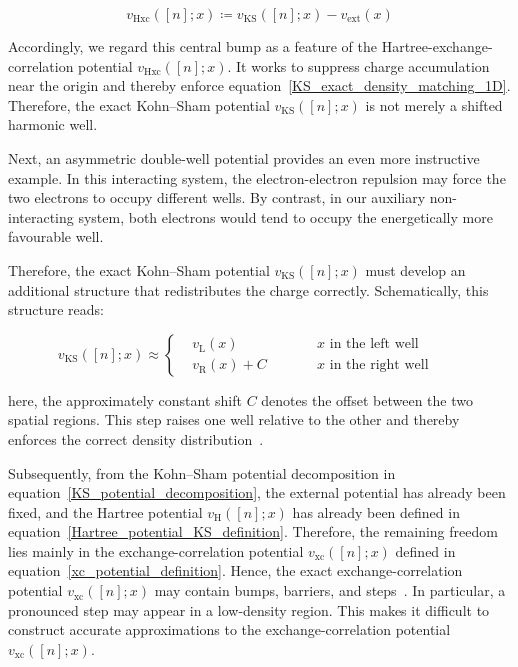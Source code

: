 \begin{equation}
    v_\mathrm{Hxc}([n];x)\coloneqq
    v_\mathrm{KS}([n];x)-v_\mathrm{ext}(x)
\label{Hxc_potential_definition_1D}
\end{equation}

Accordingly, we regard this central bump as a feature of the Hartree-exchange-correlation potential $v_\mathrm{Hxc}([n];x)$.
It works to suppress charge accumulation near the origin and thereby enforce equation~\eqref{KS_exact_density_matching_1D}.
Therefore, the exact Kohn--Sham potential $v_\mathrm{KS}([n];x)$ is not merely a shifted harmonic well.

Next, an asymmetric double-well potential provides an even more instructive example.
In this interacting system,
the electron-electron repulsion may force the two electrons to occupy different wells.
By contrast, in our auxiliary non-interacting system,
both electrons would tend to occupy the energetically more favourable well.

Therefore, the exact Kohn--Sham potential $v_\mathrm{KS}([n];x)$ must develop an additional structure that redistributes the charge correctly.
Schematically, this structure reads:

\begin{equation}
v_\mathrm{KS}([n];x)\approx\left\{
\begin{aligned}
    &v_\mathrm{L}(x)      &&\qquad \text{$x$ in the left well} \\
    &v_\mathrm{R}(x)+C    &&\qquad \text{$x$ in the right well}
\end{aligned}\right.
\qquad
\label{KS_step_structure_schematic}
\end{equation}

here, the approximately constant shift $C$ denotes the offset between the two spatial regions.
This step raises one well relative to the other and thereby enforces the correct density distribution~\cite{makmal2011dissociation}.

Subsequently, from the Kohn--Sham potential decomposition in equation~\eqref{KS_potential_decomposition},
the external potential has already been fixed, and the Hartree potential $v_\mathrm{H}([n];x)$ has already been defined in equation~\eqref{Hartree_potential_KS_definition}.
Therefore, the remaining freedom lies mainly in the exchange-correlation potential $v_\mathrm{xc}([n];x)$ defined in equation~\eqref{xc_potential_definition}.
Hence, the exact exchange-correlation potential $v_\mathrm{xc}([n];x)$ may contain bumps, barriers, and steps~\cite{hodgson2016origin}.
In particular, a pronounced step may appear in a low-density region.
This makes it difficult to construct accurate approximations to the exchange-correlation potential $v_\mathrm{xc}([n];x)$.

